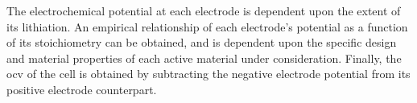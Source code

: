 The electrochemical potential at each electrode  is dependent upon the extent of
its  lithiation. An  empirical  relationship of  each  electrode's potential  as
a  function  of  its  stoichiometry  can be  obtained,  and  is  dependent  upon
the  specific design  and  material  properties of  each  active material  under
consideration. Finally, the \gls{ocv} of the cell is obtained by subtracting the
negative electrode potential from its positive electrode counterpart.





